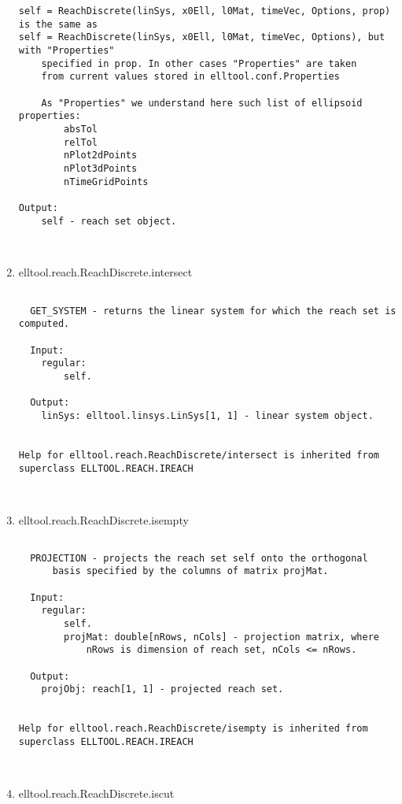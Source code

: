 \begin{enumerate}
\begin{lstlisting}
self = ReachDiscrete(linSys, x0Ell, l0Mat, timeVec, Options, prop) is the same as
self = ReachDiscrete(linSys, x0Ell, l0Mat, timeVec, Options), but with "Properties"
    specified in prop. In other cases "Properties" are taken
    from current values stored in elltool.conf.Properties

    As "Properties" we understand here such list of ellipsoid properties:
        absTol
        relTol
        nPlot2dPoints
        nPlot3dPoints
        nTimeGridPoints

Output:
    self - reach set object.



\end{lstlisting}
\fontfamily{\familydefault}
\selectfont
\item {elltool.reach.ReachDiscrete.intersect}
\selectfont
\begin{lstlisting}

  GET_SYSTEM - returns the linear system for which the reach set is computed.

  Input:
    regular:
        self.

  Output:
    linSys: elltool.linsys.LinSys[1, 1] - linear system object.


Help for elltool.reach.ReachDiscrete/intersect is inherited from superclass ELLTOOL.REACH.IREACH



\end{lstlisting}
\fontfamily{\familydefault}
\selectfont
\item {elltool.reach.ReachDiscrete.isempty}
\selectfont
\begin{lstlisting}

  PROJECTION - projects the reach set self onto the orthogonal
      basis specified by the columns of matrix projMat.

  Input:
    regular:
        self.
        projMat: double[nRows, nCols] - projection matrix, where
            nRows is dimension of reach set, nCols <= nRows.

  Output:
    projObj: reach[1, 1] - projected reach set.


Help for elltool.reach.ReachDiscrete/isempty is inherited from superclass ELLTOOL.REACH.IREACH



\end{lstlisting}
\fontfamily{\familydefault}
\selectfont
\item {elltool.reach.ReachDiscrete.iscut}
\selectfont
\begin{lstlisting}


\end{lstlisting}
\end{enumerate}
